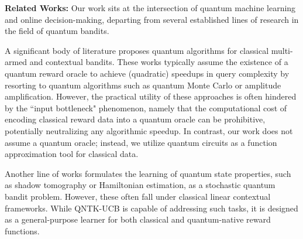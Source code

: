 \documentclass[pdflatex,sn-mathphys-num]{sn-jnl}%
\theoremstyle{thmstyleone}%
\theoremstyle{thmstyletwo}%
\theoremstyle{thmstylethree}%
\begin{document}
\textbf{Related Works:} Our work sits at the intersection of quantum machine learning and online decision-making, departing from several established lines of research in the field of quantum bandits.

A significant body of literature \cite{wan2023quantum, dai2023quantum, hikima2024quantum, siam2025quantum} proposes quantum algorithms for classical multi-armed and contextual bandits. 
These works typically assume the existence of a quantum reward oracle to achieve (quadratic) speedups in query complexity by resorting to quantum algorithms such as quantum Monte Carlo or amplitude amplification. However, the practical utility of these approaches is often hindered by the ``input bottleneck" phenomenon, namely that the computational cost of encoding classical reward data into a quantum oracle can be prohibitive, potentially neutralizing any algorithmic speedup. In contrast, our work does not assume a quantum oracle; instead, we utilize quantum circuits as a function approximation tool for classical data.

Another line of works \cite{lumbreras2022multi, brahmachari2024quantum} formulates the learning of quantum state properties, such as shadow tomography or Hamiltonian estimation, as a stochastic quantum bandit problem. However, these often fall under classical linear contextual frameworks. While QNTK-UCB is capable of addressing such tasks, it is designed as a general-purpose learner for both classical and quantum-native reward functions. 

\end{document}
